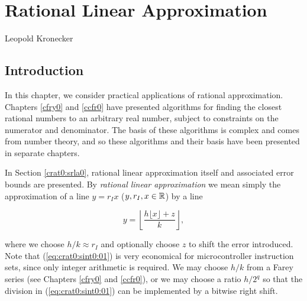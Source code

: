 
\chapter{Rational Linear Approximation}

\label{crat0}

                   {Leopold Kronecker}

\section{Introduction}
\label{crat0:sint0}

In this chapter, we consider practical applications of
rational approximation.
Chapters \cfryzeroxrefhyphen\ref{cfry0} and \ccfrzeroxrefhyphen\ref{ccfr0}
have presented algorithms for finding 
the closest rational numbers to an arbitrary real number,
subject to constraints on the numerator and denominator.
The basis of these algorithms is complex and comes from number theory, and so
these algorithms and their basis have been presented in separate chapters.

In Section \ref{crat0:srla0}, rational linear approximation itself
and associated error bounds are presented.  By \emph{rational linear
approximation} we mean simply the approximation of a line
$y = r_I x$ ($y, r_I, x \in {\mathbb{R}}$) by a line

\begin{equation}
\label{eq:crat0:sint0:01}
y = \left\lfloor
    \frac{h \lfloor x \rfloor + z}{k}
    \right\rfloor ,
\end{equation}

\noindent{}where we choose $h/k \approx r_I$ and optionally choose $z$ to 
shift the error introduced.  Note that (\ref{eq:crat0:sint0:01}) is
very economical for microcontroller instruction sets, since only integer
arithmetic is required.  We may choose $h/k$ from a Farey series (see
Chapters \cfryzeroxrefhyphen\ref{cfry0} and \ccfrzeroxrefhyphen\ref{ccfr0}), or 
we may choose a ratio $h/2^q$ so that the division in (\ref{eq:crat0:sint0:01})
can be implemented
by a bitwise right shift.

